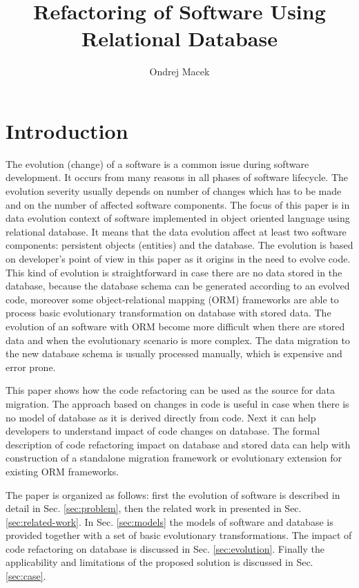 \documentclass[11pt]{article}
\title{Refactoring of Software Using Relational Database}
\author{Ondrej Macek}
\begin{document}
\maketitle
\section{Introduction}
\label{sec:intro}
The evolution (change) of a software is a common issue during software development. It occurs from many reasons in all phases of software lifecycle. The evolution severity usually depends on number of changes which has to be made and on the number of affected software components. The focus of this paper is in data evolution context of software implemented in object oriented language using relational database. It means that the data evolution affect at least two software components: persistent objects (entities) and the database. The evolution is based on developer's point of view in this paper as it origins in the need to evolve code. This kind of evolution is straightforward in case there are no data stored in the database, because the database schema can be generated according to an evolved code, moreover some object-relational mapping (ORM) frameworks are able to process basic evolutionary transformation on database with stored data. The evolution of an software with ORM become more difficult when there are stored data and when the evolutionary scenario is more complex. The data migration to the new database schema is usually processed manually, which is expensive and error prone.

This paper shows how the code refactoring can be used as the source for data migration. The approach based on changes in code is useful in case when there is no model of database as it is derived directly from code. Next it can help developers to understand impact  of code changes on database. The formal description of code refactoring impact on database and stored data can help with construction of a standalone migration framework or evolutionary extension for existing ORM frameworks.

The paper is organized as follows: first the evolution of software is described in detail in Sec. \ref{sec:problem}, then the related work in presented in Sec. \ref{sec:related-work}. In Sec. \ref{sec:models} the models of software and database is provided together with a set of basic evolutionary transformations. The impact of code refactoring on database is discussed in Sec. \ref{sec:evolution}. Finally the applicability and limitations of the proposed solution is discussed in Sec. \ref{sec:case}.
\end{document}
